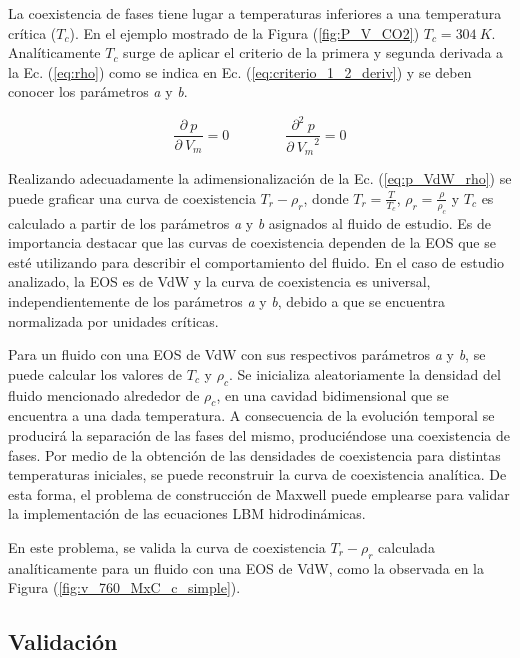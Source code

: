 La coexistencia de fases tiene lugar a temperaturas inferiores a una temperatura crítica ($T_c$). En el ejemplo mostrado de la Figura (\ref{fig:P_V_CO2}) $T_c = 304 \> K$. Analíticamente $T_c$ surge de aplicar el criterio de la primera y segunda derivada a la Ec. (\ref{eq:rho}) como se indica en Ec. (\ref{eq:criterio_1_2_deriv}) y se deben conocer los parámetros \textit{a} y \textit{b}.

\begin{equation}
	\frac{\partial\> p}{\partial\> V_{m}} = 0 \qquad \qquad \frac{\partial^{2} \> p}{\partial\> {V_{m}}^{2}} = 0
	\label{eq:criterio_1_2_deriv}
\end{equation}

Realizando adecuadamente la adimensionalización  de la Ec. (\ref{eq:p_VdW_rho}) se puede graficar una curva de coexistencia $T_r - \rho_r$, donde $T_r = \frac{T}{T_c}$, $\rho_r = \frac{\rho}{\rho_c}$ y $T_c$ es calculado a partir de los parámetros \textit{a} y \textit{b} asignados al fluido de estudio. Es de importancia destacar que las curvas de coexistencia dependen de la EOS que se esté utilizando para describir el comportamiento del fluido. En el caso de estudio analizado, la EOS es de VdW y la curva de coexistencia es universal, independientemente de los parámetros \textit{a} y \textit{b}, debido a que se encuentra normalizada por unidades críticas.

Para un fluido con una EOS de VdW con sus respectivos parámetros \textit{a} y \textit{b}, se puede calcular los valores de $T_c$ y $\rho_c$. Se inicializa aleatoriamente la densidad del fluido mencionado alrededor de $\rho_c$, en una cavidad bidimensional que se encuentra a una dada temperatura. A consecuencia de la evolución temporal se producirá la separación de las fases del mismo, produciéndose una coexistencia de fases. Por medio de la obtención de las densidades de coexistencia para distintas temperaturas iniciales, se puede reconstruir la curva de coexistencia analítica. De esta forma, el problema de construcción de Maxwell puede emplearse para validar la implementación de las ecuaciones LBM hidrodinámicas.

En este problema, se valida la curva de coexistencia $T_r - \rho_r$ calculada analíticamente para un fluido con una EOS de VdW, como la observada en la Figura (\ref{fig:v_760_MxC_c_simple}). 

\subsection{Validación}

